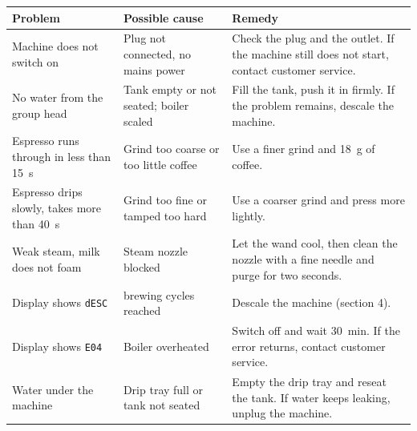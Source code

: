 \documentclass[10pt,a4paper]{article}
\begin{document}
\begin{center}
\small
{}
\begin{tabularx}{\linewidth}{@{}>{\raggedright\arraybackslash}p{3.6cm} >{\raggedright\arraybackslash}X >{\raggedright\arraybackslash}X@{}}
  \toprule
  \textbf{Problem} & \textbf{Possible cause} & \textbf{Remedy} \\
  \midrule
  Machine does not switch on & Plug not connected, no mains power & Check the plug and the outlet. If the machine still does not start, contact customer service. \\
  \addlinespace[2pt]
  No water from the group head & Tank empty or not seated; boiler scaled & Fill the tank, push it in firmly. If the problem remains, descale the machine. \\
  \addlinespace[2pt]
  Espresso runs through in less than \qty{15}{s} & Grind too coarse or too little coffee & Use a finer grind and \qty{18}{g} of coffee. \\
  \addlinespace[2pt]
  Espresso drips slowly, takes more than \qty{40}{s} & Grind too fine or tamped too hard & Use a coarser grind and press more lightly. \\
  \addlinespace[2pt]
  Weak steam, milk does not foam & Steam nozzle blocked & Let the wand cool, then clean the nozzle with a fine needle and purge for two seconds. \\
  \addlinespace[2pt]
  Display shows \texttt{dESC} & 200 brewing cycles reached & Descale the machine (section 4). \\
  \addlinespace[2pt]
  Display shows \texttt{E04} & Boiler overheated & Switch off and wait \qty{30}{min}. If the error returns, contact customer service. \\
  \addlinespace[2pt]
  Water under the machine & Drip tray full or tank not seated & Empty the drip tray and reseat the tank. If water keeps leaking, unplug the machine. \\
  \bottomrule
\end{tabularx}
\end{center}
\end{document}
